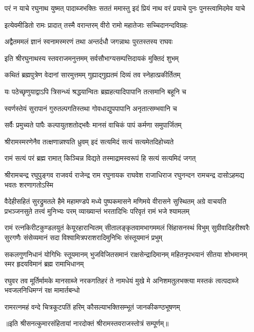 \fourlineindentedshloka
{परं न याचे रघुनाथ युष्मत्}
{पादाब्जभक्तिः सततं ममास्तु}
{इदं प्रियं नाथ वरं प्रयाचे}
{पुनः पुनस्त्वामिदमेव याचे}%


\twolineshloka
{इत्येवमीडितो रामः प्रादात् तस्मै वरान्तरम्}
{वीरो रामो महातेजाः सच्चिदानन्दविग्रहः}%

\twolineshloka
{अद्वैतममलं ज्ञानं स्वनामस्मरणं तथा}
{अन्तर्दधौ जगन्नाथः पुरतस्तस्य राघवः}%

\twolineshloka
{इति श्रीरघुनाथस्य स्तवराजमनुत्तमम्}
{सर्वसौभाग्यसम्पत्तिदायकं मुक्तिदं शुभम्}%

\twolineshloka
{कथितं ब्रह्मपुत्रेण वेदानां सारमुत्तमम्}
{गुह्याद्गुह्यतमं दिव्यं तव स्नेहात्प्रकीर्तितम्}%

\twolineshloka
{यः पठेच्छृणुयाद्वाऽपि त्रिसन्ध्यं श्रद्धयान्वितः}
{ब्रह्महत्यादिपापानि तत्समानि बहूनि च}%

\twolineshloka
{स्वर्णस्तेयं सुरापानं गुरुतल्पगतिस्तथा}
{गोवधाद्युपपापानि अनृतात्सम्भवानि च}%

\twolineshloka
{सर्वैः प्रमुच्यते पापैः कल्पायुतशतोद्भवैः}
{मानसं वाचिकं पापं कर्मणा समुपार्जितम्}%

\twolineshloka
{श्रीरामस्मरणेनैव तत्क्षणान्नश्यति ध्रुवम्}
{इदं सत्यमिदं सत्यं सत्यमेतदिहोच्यते}%

\twolineshloka
{रामं सत्यं परं ब्रह्म रामात् किञ्चिन्न विद्यते}
{तस्माद्रामस्वरूपं हि सत्यं सत्यमिदं जगत्}%

\fourlineindentedshloka
{श्रीरामचन्द्र रघुपुङ्गव राजवर्य}
{राजेन्द्र राम रघुनायक राघवेश}
{राजाधिराज रघुनन्दन रामचन्द्र}
{दासोऽहमद्य भवतः शरणागतोऽस्मि}%

\fourlineindentedshloka
{वैदेहीसहितं सुरद्रुमतले हैमे महामण्डपे}
{मध्ये पुष्पकमासने मणिमये वीरासने सुस्थितम्}
{अग्रे वाचयति प्रभञ्जनसुते तत्त्वं मुनिभ्यः परम्}
{व्याख्यान्तं भरतादिभिः परिवृतं रामं भजे श्यामलम्}%

\fourlineindentedshloka
{रामं रत्नकिरीटकुण्डलयुतं केयूरहारान्वितम्}
{सीतालङ्कृतवामभागममलं सिंहासनस्थं विभुम्}
{सुग्रीवादिहरीश्वरैः सुरगणैः संसेव्यमानं सदा}
{विश्वामित्रपराशरादिमुनिभिः संस्तूयमानं प्रभुम्}%

\fourlineindentedshloka
{सकलगुणनिधानं योगिभिः स्तूयमानम्}
{भुजविजितसमानं राक्षसेन्द्रादिमानम्}
{महितनृपभयानं सीतया शोभमानम्}
{स्मर हृदयविमानं ब्रह्म रामाभिधानम्}%

\fourlineindentedshloka
{रघुवर तव मूर्तिर्मामके मानसाब्जे}
{नरकगतिहरं ते नामधेयं मुखे मे}
{अनिशमतुलभक्त्या मस्तकं त्वत्पदाब्जे}
{भवजलनिधिमग्नं रक्ष मामार्तबन्धो}%

\twolineshloka
{रामरत्नमहं वन्दे चित्रकूटपतिं हरिम्}
{कौसल्याभक्तिसम्भूतं जानकीकण्ठभूषणम्}%

॥इति श्रीसनत्कुमारसंहितायां नारदोक्तं श्रीरामस्तवराजस्तोत्रं सम्पूर्णम्॥